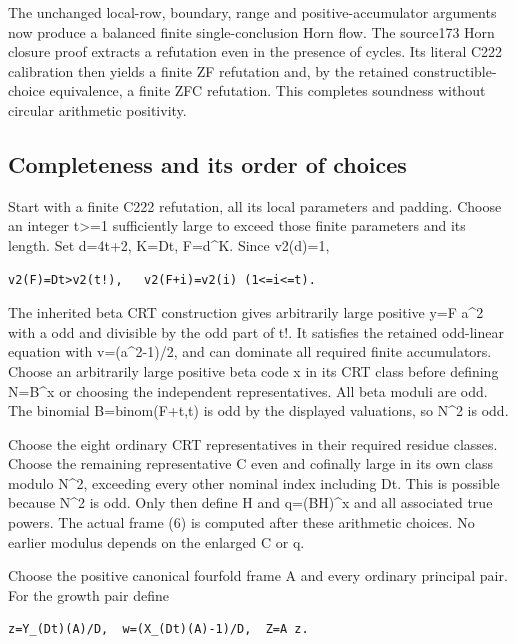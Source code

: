 The unchanged local-row, boundary, range and positive-accumulator
arguments now produce a balanced finite single-conclusion Horn flow. The
source173 Horn closure proof extracts a refutation even in the presence
of cycles. Its literal C222 calibration then yields a finite ZF
refutation and, by the retained constructible-choice equivalence, a
finite ZFC refutation. This completes soundness without circular
arithmetic positivity.

\subsection{Completeness and its order of
choices}\label{completeness-and-its-order-of-choices}

Start with a finite C222 refutation, all its local parameters and
padding. Choose an integer t\textgreater=1 sufficiently large to exceed
those finite parameters and its length. Set d=4t+2, K=Dt, F=d\^{}K.
Since v2(d)=1,

\begin{verbatim}
v2(F)=Dt>v2(t!),   v2(F+i)=v2(i) (1<=i<=t).
\end{verbatim}

The inherited beta CRT construction gives arbitrarily large positive y=F
a\^{}2 with a odd and divisible by the odd part of t!. It satisfies the
retained odd-linear equation with v=(a\^{}2-1)/2, and can dominate all
required finite accumulators. Choose an arbitrarily large positive beta
code x in its CRT class before defining N=B\^{}x or choosing the
independent representatives. All beta moduli are odd. The binomial
B=binom(F+t,t) is odd by the displayed valuations, so N\^{}2 is odd.

Choose the eight ordinary CRT representatives in their required residue
classes. Choose the remaining representative C even and cofinally large
in its own class modulo N\^{}2, exceeding every other nominal index
including Dt. This is possible because N\^{}2 is odd. Only then define H
and q=(BH)\^{}x and all associated true powers. The actual frame (6) is
computed after these arithmetic choices. No earlier modulus depends on
the enlarged C or q.

Choose the positive canonical fourfold frame A and every ordinary
principal pair. For the growth pair define

\begin{verbatim}
z=Y_(Dt)(A)/D,  w=(X_(Dt)(A)-1)/D,  Z=A z.
\end{verbatim}

